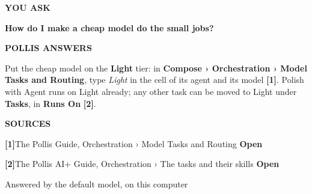 \documentclass[10pt,a4paper]{article}
\begin{document}
\vspace{3mm}
\begin{tcolorbox}[enhanced, colback=white, colframe=navy, boxrule=0.6pt, arc=3pt,
  left=9pt, right=9pt, top=8pt, bottom=8pt, fontupper=\small\raggedright]
{\color{soft}\footnotesize\bfseries YOU ASK}\par\vspace{1pt}
{\color{navy}\bfseries How do I make a cheap model do the small jobs?}\par\vspace{6pt}
{\color{soft}\footnotesize\bfseries POLLIS ANSWERS}\par\vspace{1pt}
Put the cheap model on the \textbf{Light} tier: in \textbf{Compose › Orchestration › Model Tasks and Routing}, type
\emph{Light} in the cell of its agent and its model {\color{deepamber}\bfseries[1]}. Polish with Agent runs on Light
already; any other task can be moved to Light under \textbf{Tasks}, in \textbf{Runs On}
{\color{deepamber}\bfseries[2]}.\par\vspace{6pt}
{\color{soft}\footnotesize\bfseries SOURCES}\par\vspace{1pt}
{\color{deepamber}\bfseries[1]}\enspace The Pollis Guide, Orchestration › Model Tasks and Routing\hfill
  {\color{navy}\bfseries Open}\par
{\color{deepamber}\bfseries[2]}\enspace The Pollis AI+ Guide, Orchestration › The tasks and their skills\hfill
  {\color{navy}\bfseries Open}\par\vspace{5pt}
{\color{soft}\footnotesize Answered by the default model, on this computer}
\end{tcolorbox}
\end{document}
